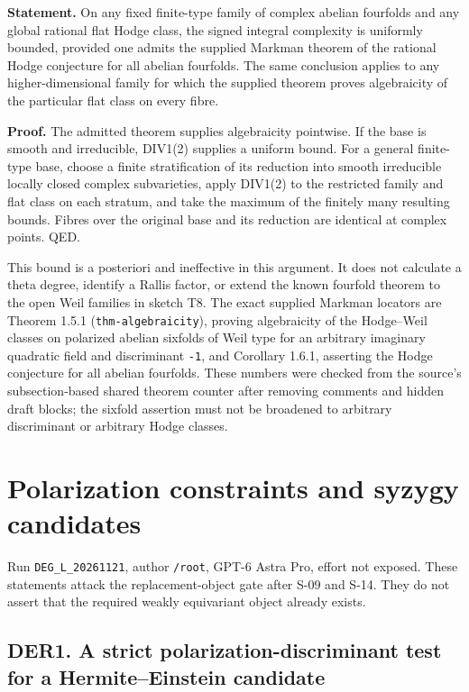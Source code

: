 \documentclass[11pt,a4paper]{article}
\theoremstyle{definition}
\begin{document}
\textbf{Statement.} On any fixed finite-type family of complex abelian
fourfolds and any global rational flat Hodge class, the signed integral
complexity is uniformly bounded, provided one admits the supplied
Markman theorem of the rational Hodge conjecture for all abelian
fourfolds. The same conclusion applies to any higher-dimensional family
for which the supplied theorem proves algebraicity of the particular
flat class on every fibre.

\textbf{Proof.} The admitted theorem supplies algebraicity pointwise. If
the base is smooth and irreducible, DIV1(2) supplies a uniform bound.
For a general finite-type base, choose a finite stratification of its
reduction into smooth irreducible locally closed complex subvarieties,
apply DIV1(2) to the restricted family and flat class on each stratum,
and take the maximum of the finitely many resulting bounds. Fibres over
the original base and its reduction are identical at complex points.
QED.

This bound is a posteriori and ineffective in this argument. It does not
calculate a theta degree, identify a Rallis factor, or extend the known
fourfold theorem to the open Weil families in sketch T8. The exact
supplied Markman locators are Theorem 1.5.1 (\texttt{thm-algebraicity}),
proving algebraicity of the Hodge--Weil classes on polarized abelian
sixfolds of Weil type for an arbitrary imaginary quadratic field and
discriminant \texttt{-1}, and Corollary 1.6.1, asserting the Hodge
conjecture for all abelian fourfolds. These numbers were checked from
the source's subsection-based shared theorem counter after removing
comments and hidden draft blocks; the sixfold assertion must not be
broadened to arbitrary discriminant or arbitrary Hodge classes.

\section{Polarization constraints and syzygy candidates}

Run \texttt{DEG\_L\_20261121}, author \texttt{/root}, GPT-6 Astra Pro,
effort not exposed. These statements attack the replacement-object gate
after S-09 and S-14. They do not assert that the required weakly
equivariant object already exists.

\subsection{DER1. A strict polarization-discriminant test for a
Hermite--Einstein
candidate}\label{der1.-a-strict-polarization-discriminant-test-for-a-hermiteeinstein-candidate}
\end{document}
